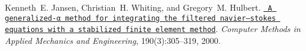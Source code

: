 
\begin{DoxyDescription}
\item[\label{citelist_CITEREF_JANSEN2000305}%
\Hypertarget{citelist_CITEREF_JANSEN2000305}%
\mbox{[}1\mbox{]}]Kenneth~E. Jansen, Christian~H. Whiting, and Gregory~M. Hulbert. \href{https://www.sciencedirect.com/science/article/pii/S0045782500002036}{\texttt{ A generalized-\/α method for integrating the filtered navier–stokes equations with a stabilized finite element method}}. {\itshape Computer Methods in Applied Mechanics and Engineering}, 190(3)\+:305--319, 2000. 


\end{DoxyDescription}